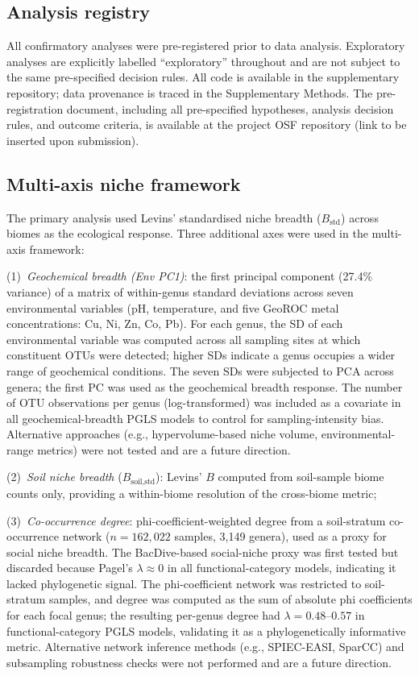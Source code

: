 \documentclass[times]{zHenriquesLab-StyleBioRxiv}
\begin{document}
\subsection{Analysis registry}

All confirmatory analyses were pre-registered prior to data analysis.
Exploratory analyses are explicitly labelled
``exploratory'' throughout and are not subject to the same pre-specified decision
rules. All code is available in the supplementary repository; data provenance
is traced in the Supplementary Methods. The pre-registration document, including
all pre-specified hypotheses, analysis decision rules, and outcome criteria, is
available at the project OSF repository (link to be inserted upon submission).

\subsection{Multi-axis niche framework}

The primary analysis used Levins' standardised niche breadth ($B_\text{std}$)
across biomes as the ecological response. Three additional axes were used in
the multi-axis framework:

(1)~\textit{Geochemical breadth (Env PC1)}: the first principal component
(27.4\% variance) of a matrix of within-genus standard deviations across seven
environmental variables (pH, temperature, and five GeoROC metal concentrations:
Cu, Ni, Zn, Co, Pb). For each genus, the SD of each environmental variable
was computed across all sampling sites at which constituent OTUs were detected;
higher SDs indicate a genus occupies a wider range of geochemical conditions.
The seven SDs were subjected to PCA across genera; the first PC was used as the
geochemical breadth response. The number of OTU observations per genus
(log-transformed) was included as a covariate in all geochemical-breadth PGLS
models to control for sampling-intensity bias. Alternative approaches (e.g.,
hypervolume-based niche volume, environmental-range metrics) were not tested and
are a future direction.

(2)~\textit{Soil niche breadth} ($B_\text{soil,std}$): Levins' $B$ computed
from soil-sample biome counts only, providing a within-biome resolution of the
cross-biome metric;

(3)~\textit{Co-occurrence degree}: phi-coefficient-weighted degree from a
soil-stratum co-occurrence network ($n = 162{,}022$ samples, 3,149 genera),
used as a proxy for social niche breadth. The BacDive-based social-niche
proxy was first tested but discarded because Pagel's $\lambda \approx 0$ in
all functional-category models, indicating it lacked phylogenetic signal. The
phi-coefficient network was restricted to soil-stratum samples, and degree was
computed as the sum of absolute phi coefficients for each focal genus; the
resulting per-genus degree had $\lambda = 0.48$--$0.57$ in functional-category
PGLS models, validating it as a phylogenetically informative metric. Alternative
network inference methods (e.g., SPIEC-EASI, SparCC) and subsampling
robustness checks were not performed and are a future direction.
\end{document}
